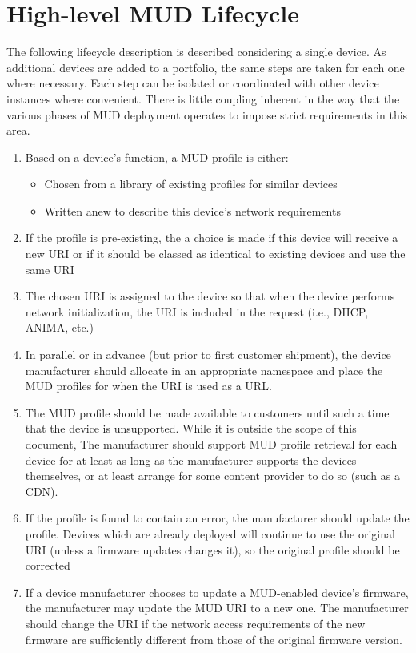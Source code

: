 \documentclass[conference]{IEEEtran}
\begin{document}
\section{High-level MUD Lifecycle}

The following lifecycle description is described considering a single
device.  As additional devices are added to a portfolio, the same
steps are taken for each one where necessary.  Each step can be
isolated or coordinated with other device instances where convenient.
There is little coupling inherent in the way that the various phases
of MUD deployment operates to impose strict requirements in this area.

\begin{enumerate}
\item Based on a device's function, a MUD profile is either:
  \begin{itemize}
  \item Chosen from a library of existing profiles for similar devices
    
  \item Written anew to describe this device's network requirements
  \end{itemize}
\item If the profile is pre-existing, the a choice is made if this
  device will receive a new URI or if it should be classed as
  identical to existing devices and use the same URI
 
\item The chosen URI is assigned to the device so that when the device
  performs network initialization, the URI is included in the request
  (i.e., DHCP, ANIMA, etc.)
 
\item In parallel or in advance (but prior to first customer
  shipment), the device manufacturer should allocate in an appropriate
  namespace and place the MUD profiles for when the URI is used as a
  URL.
 
\item The MUD profile should be made available to customers until such
  a time that the device is unsupported.  While it is outside the
  scope of this document, The manufacturer should support MUD profile
  retrieval for each device for at least as long as the manufacturer
  supports the devices themselves, or at least arrange for some
  content provider to do so (such as a CDN).

\item If the profile is found to contain an error, the manufacturer
  should update the profile.  Devices which are already deployed will
  continue to use the original URI (unless a firmware updates changes
  it), so the original profile should be corrected
 
\item If a device manufacturer chooses to update a MUD-enabled
  device's firmware, the manufacturer may update the MUD URI to a new
  one.  The manufacturer should change the URI if the network access
  requirements of the new firmware are sufficiently different from
  those of the original firmware version.
\end{enumerate}
\end{document}
